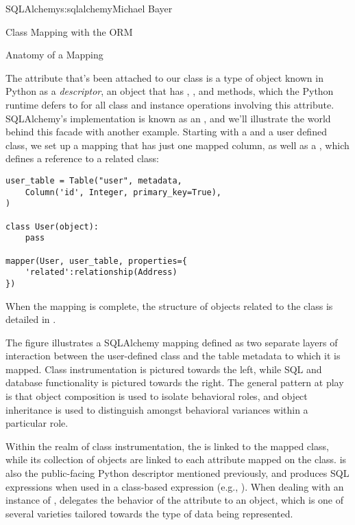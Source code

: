 \begin{aosachapter}{SQLAlchemy}{s:sqlalchemy}{Michael Bayer}
\begin{aosasect1}{Class Mapping with the ORM}
\begin{aosasect2}{Anatomy of a Mapping}

The  attribute that's been attached to our  class is a type of
object known in Python as a \emph{descriptor}, an object
that has , , and  methods, which the Python
runtime defers to for all class and instance operations involving this attribute.
SQLAlchemy's implementation is known as an ,
and we'll illustrate the world behind this facade with another example.
Starting with a  and a user defined class, we set up a mapping that has just one
mapped column, as well as a , which defines a reference to a related class:

\begin{verbatim}
user_table = Table("user", metadata,
    Column('id', Integer, primary_key=True),
)

class User(object):
    pass

mapper(User, user_table, properties={
    'related':relationship(Address)
})
\end{verbatim}

When the mapping is complete, the structure of objects related to the class is detailed in .


The figure illustrates a SQLAlchemy mapping defined as two separate layers
of interaction between the user-defined class and the table metadata to which
it is mapped.  Class instrumentation is pictured towards the left,
while SQL and database functionality is pictured towards the right.  The general pattern
at play is that object composition is used to isolate behavioral roles, and object inheritance
is used to distinguish amongst behavioral variances within a particular role.

Within the realm of class instrumentation, the  is linked to the mapped class, while
its collection of  objects are linked to each attribute mapped on the class.
 is also the public-facing Python descriptor mentioned previously, and
produces SQL expressions when used in a class-based expression (e.g., ).   When
dealing with an instance of ,  delegates the behavior of the
attribute to an  object, which is one of several varieties tailored towards the
type of data being represented.


\end{aosasect2}
\end{aosasect1}
\end{aosachapter}
